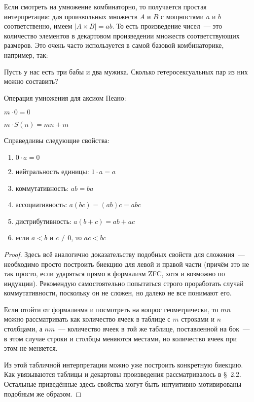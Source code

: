 Если смотреть на умножение комбинаторно, то получается простая интерпретация: для произвольных множеств $A$ и $B$ с мощностями $a$ и $b$ соответственно, имеем $|A\times B| = ab$. То есть произведение чисел~--- это количество элементов в декартовом произведении множеств соответствующих размеров. Это очень часто используется в самой базовой комбинаторике, например, так:

\begin{exercise}
Пусть у нас есть три бабы и два мужика. Сколько гетеросексуальных пар из них можно составить?
\end{exercise}

\begin{definition}
Операция умножения для аксиом Пеано:\newline
\item $m\cdot 0 = 0$\newline
\item $m\cdot S(n) = mn + m$
\end{definition}

\begin{thm}
Справедливы следующие свойства:
\begin{enumerate}
\item $0\cdot a = 0$
\item нейтральность единицы: $1\cdot a = a$
\item коммутативность: $ab = ba$
\item ассоциативность: $a(bc) = (ab)c = abc$
\item дистрибутивность: $a(b+c) = ab + ac$
\item если $a < b$ и $c \not= 0$, то $ac < bc$
\end{enumerate}
\end{thm}
\begin{proof}
Здесь всё аналогично доказательству подобных свойств для сложения~--- необходимо просто построить биекцию для левой и правой части (причём это не так просто, если ударяться прямо в формализм ZFC, хотя и возможно по индукции). Рекомендую самостоятельно попытаться строго проработать случай коммутативности, поскольку он не сложен, но далеко не все понимают его.

Если отойти от формализма и посмотреть на вопрос геометрически, то $mn$ можно рассматривать как количество ячеек в таблице с $m$ строками и $n$ столбцами, а $nm$~--- количество ячеек в той же таблице, поставленной на бок~--- в этом случае строки и столбцы меняются местами, но количество ячеек при этом не меняется.

Из этой табличной интерпретации можно уже построить конкретную биекцию. Как увязываются таблицы и декартовы произведения рассматривалось в \S~2.2. Остальные приведённые здесь свойства могут быть интуитивно мотивированы подобным же образом.
\end{proof}


